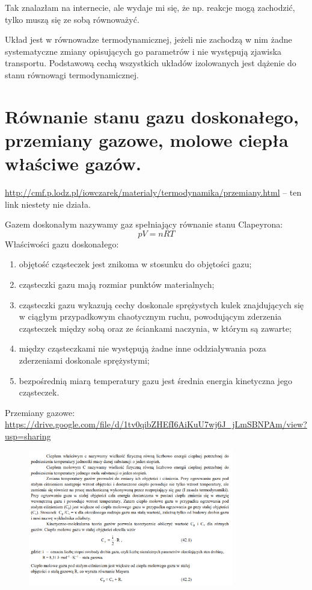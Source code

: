 \documentclass{article}
\begin{document}
Tak znalazłam na internecie, ale wydaje mi się, że np. reakcje mogą zachodzić, tylko muszą się ze sobą równoważyć.

Układ jest w równowadze termodynamicznej, jeżeli nie zachodzą w nim żadne systematyczne zmiany opisujących go parametrów i nie występują zjawiska transportu. Podstawową cechą wszystkich układów izolowanych jest dążenie do stanu równowagi termodynamicznej. 

\section{Równanie stanu gazu doskonałego, przemiany gazowe, molowe ciepła właściwe gazów.}
\url{http://cmf.p.lodz.pl/iowczarek/materialy/termodynamika/przemiany.html} -- ten link niestety nie działa.

Gazem doskonałym nazywamy gaz spełniający równanie stanu Clapeyrona:
\begin{equation*}
    pV=nRT
\end{equation*}
Właściwości gazu doskonałego:
\begin{enumerate}
    \item objętość cząsteczek jest znikoma w stosunku do objętości gazu;
    \item cząsteczki gazu mają rozmiar punktów materialnych;
    \item cząsteczki gazu wykazują cechy doskonale sprężystych kulek znajdujących się w ciągłym przypadkowym chaotycznym ruchu, powodującym zderzenia cząsteczek między sobą oraz ze ściankami naczynia, w którym są zawarte;
    \item między cząsteczkami nie występują żadne inne oddziaływania poza zderzeniami doskonale sprężystymi;
    \item bezpośrednią miarą temperatury gazu jest średnia energia kinetyczna jego cząsteczek.
\end{enumerate}

Przemiany gazowe: \url{https://drive.google.com/file/d/1tv0qibZHEfI6AiKuU7wj6J_jLmSBNPAm/view?usp=sharing}

\begin{figure}[H]
    \centering
    \includegraphics[width=0.8\textwidth]{images/ciepło właściwe.png}
\end{figure}
\end{document}
